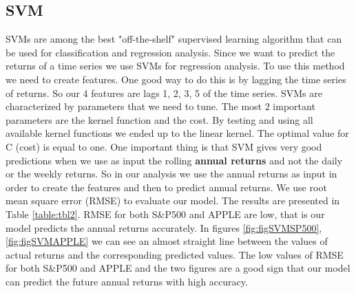 \documentclass[letterpaper,12pt]{article}
\begin{document}
\subsection{SVM}
SVMs are among the best "off-the-shelf" supervised learning algorithm that can be used for classification and regression analysis. Since we want to predict the returns of a time series we use SVMs for regression analysis. To use this method we need to create features. One good way to do this is by lagging the time series of returns. So our 4 features are lags 1, 2, 3, 5 of the time series. SVMs are characterized by parameters that we need to tune. The most 2 important parameters are the kernel function and the cost. By testing and using all available kernel functions we ended up to the linear kernel. The optimal value for C (cost) is equal to one. One important thing is that SVM gives very good predictions when we use as input the rolling \textbf{annual returns} and not the daily or the weekly returns. So in our analysis we use the annual returns as input in order to create the features and then to predict annual returns. We use root mean square error (RMSE) to evaluate our model. The results are presented in Table \ref{table:tbl2}. RMSE for both S\&P500 and APPLE are low, that is our model predicts the annual returns accurately. In figures \ref{fig:figSVMSP500}, \ref{fig:figSVMAPPLE} we can see an almost straight line between the values of actual returns and the corresponding predicted values. The low values of RMSE for both S\&P500 and APPLE and the two figures are a good sign that our model can predict the future annual returns with high accuracy.
\end{document}
